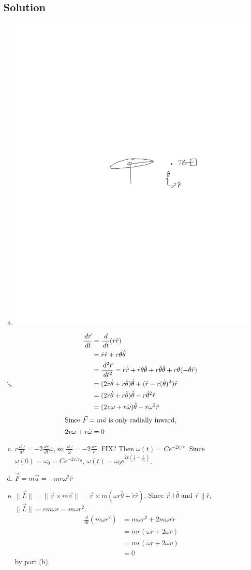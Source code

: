 \documentclass[solutions]{esg8012pset}
\renewcommand{\d}{\,d}
\providecommand{\norm}[1]{\lVert#1\rVert}
\begin{document}
\subsection{Solution}
  \begin{enumerate}[a)]
    \item \includegraphics[width=.5\textwidth]{2009-10-02_Diagram_5_0}
    \item \begin{align*}
      \frac{\d \vec r}{\d t} & = \frac{\d}{\d t}(r \hat r) \\
       & = \dot r \hat r + r\dot\theta \hat\theta \\
       & = \frac{\d^2 \vec r}{\d t^2} = \ddot r\hat r + \dot r\dot\theta \hat \theta + r \ddot\theta\hat\theta + r\dot\theta(-\dot\theta\hat r) \\
       & = (2\dot r\dot\theta + r\ddot\theta)\hat\theta +(\ddot r - r(\dot\theta)^2)\hat r \\
       & = (2\dot r\dot\theta + r\ddot\theta)\hat\theta - r\dot\theta^2\hat r \\
       & = (2v\omega + r\dot\omega)\hat\theta - r\omega^2\hat r \\
       \intertext{Since $\vec F = m \vec a$ is only radially inward,}
       2v\omega + r\dot \omega & = 0
    \end{align*}
    \item $r\frac{\d \omega}{\d t} = -2 \frac{\d r}{\d t}\omega$, so $\frac{\d \omega}{\omega} = -2\frac{\d r}{r}$.  FIX? Then $\omega(t) = C e^{-2v / r}$.   Since $\omega(0) = \omega_0 = Ce^{-2v/r_0}$, $\omega(t) = \omega_0 e^{2v\left(\frac{1}{r} - \frac{1}{r_0}\right)}$.
    \item $\vec F = m\vec a = -mr\omega^2\hat r$
    \item $\norm{\vec L} = \norm{\vec r\times m \vec v} = \vec r\times m(\omega r\hat\theta + \dot r\hat r)$.  Since $\vec r \bot \hat\theta$ and $\vec r \| \hat r$, $\norm{\vec L} = rm\omega r = m\omega r^2$.  \begin{align*}
     \frac{\d }{\d t}(m \omega r^2) & = m\dot\omega r^2 + 2m\omega r\dot r \\
      & = m r(\dot\omega r + 2\omega\dot r) \\
      & = m r(\dot \omega r + 2\omega v) \\
      & = 0
      \end{align*} by part (b).
  \end{enumerate}
\end{document}
